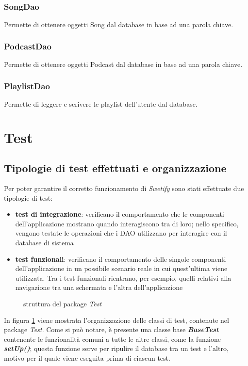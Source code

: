 \documentclass{article}
\begin{document}
  \subsubsection{SongDao}
  Permette di ottenere oggetti Song dal database in base ad una parola chiave.
  \subsubsection{PodcastDao}
  Permette di ottenere oggetti Podcast dal database in base ad una parola chiave.
  \subsubsection{PlaylistDao}
  Permette di leggere e scrivere le playlist dell'utente dal database.


  \section{Test}

  \subsection{Tipologie di test effettuati e organizzazione}

  Per poter garantire il corretto funzionamento di \textit{Swetify} sono stati effettuate due tipologie di test:
  \begin{itemize}
    \item \textbf{test di integrazione}: verificano il comportamento che le componenti dell'applicazione mostrano quando interagiscono tra di loro; nello specifico, vengono testate le operazioni che i DAO utilizzano per interagire con il database di sistema
    \item \textbf{test funzionali}: verificano il comportamento delle singole componenti dell'applicazione in un possibile scenario reale in cui quest'ultima viene utilizzata. Tra i test funzionali rientrano, per esempio, quelli relativi alla navigazione tra una schermata e l'altra dell'applicazione
  \end{itemize}

  \begin{figure}[H]
    
    \caption{struttura del package \textit{Test}}
    \label{fig:testsUML}
  \end{figure}

  In figura \ref{fig:testsUML} viene mostrata l'organizzazione delle classi di test, contenute nel package \textit{Test}. Come si può notare, è presente una classe base \textbf{\textit{BaseTest}} contenente le funzionalità comuni a tutte le altre classi, come la funzione \textbf{\textit{setUp()}}; questa funzione serve per ripulire il database tra un test e l'altro, motivo per il quale viene eseguita prima di ciascun test.
\end{document}
